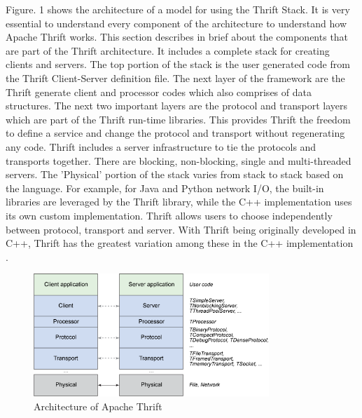 \documentclass[9pt,twocolumn,twoside]{../../styles/osajnl}
\begin{document}
Figure. 1 shows the architecture of a model for using the Thrift Stack. It is very essential to understand every component of the architecture to understand how Apache Thrift works. This section describes in brief about the components that are part of the Thrift architecture. It includes a complete stack for creating clients and servers. The top portion of the stack is the user generated code from the Thrift Client-Server definition file. The next layer of the framework are the Thrift generate client and processor codes which also comprises of data structures. The next two important layers are the protocol and transport layers which are part of the Thrift run-time libraries. This provides Thrift the freedom to define a service and change the protocol and transport without regenerating any code. Thrift includes a server infrastructure to tie the protocols and transports together. There are blocking, non-blocking, single and multi-threaded servers. The 'Physical' portion of the stack varies from stack to stack based on the language. For example, for Java and Python network I/O, the built-in libraries are leveraged by the Thrift library, while the C++ implementation uses its own custom implementation. Thrift allows users to choose independently between protocol, transport and server. With Thrift being originally developed in C++, Thrift has the greatest variation among these in the C++ implementation \cite{www-thrift-example}.

\begin{figure}[h]
    \centering
    \includegraphics[width=3.5in]{images/thrift_arch.png}
    \caption{Architecture of Apache Thrift  \cite{www-thrift-arch}}
    \label{fig:thrift_arch}
\end{figure}
\end{document}
